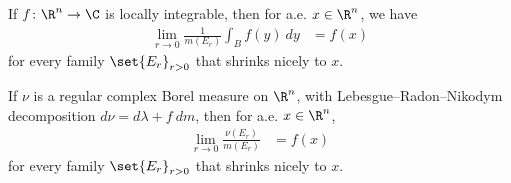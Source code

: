 \documentclass[10pt]{mypackage}
\begin{document}
\begin{theorem}
  If $f\colon \R^n\rightarrow \C$ is locally integrable, then for a.e. $x\in \R^n$, we have
  \begin{align*}
    \lim_{r\rightarrow 0} \frac{1}{m\left(E_r\right)} \int_{B}^{} f(y)\:dy &= f(x)
  \end{align*}
  for every family $\set{E_r}_{r > 0}$ that shrinks nicely to $x$.
\end{theorem}
\begin{corollary}
  If $\nu$ is a regular complex Borel measure on $\R^n$, with Lebesgue--Radon--Nikodym decomposition $d\nu = d\lambda + f\:dm$, then for a.e. $x\in \R^n$,
  \begin{align*}
    \lim_{r\rightarrow 0} \frac{\nu\left( E_r \right)}{m\left( E_r \right)} &= f(x)
  \end{align*}
  for every family $\set{E_r}_{r > 0}$ that shrinks nicely to $x$.
\end{corollary}
\end{document}
